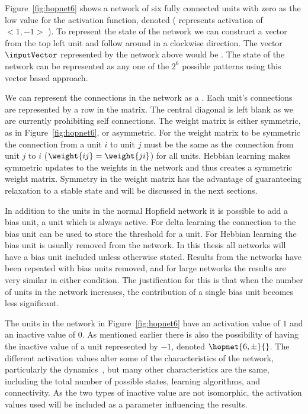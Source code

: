 Figure~\ref{fig:hopnet6} shows a network of six fully connected units with zero as the low value for the activation function, denoted  ( represents activation of $<1,-1>$ ).  To represent the state of the network we can construct a vector from the top left unit and follow around in a clockwise direction.  The vector  \(\inputVector \) represented by the network above would be .  The state of the network can be represented as any one of the \(2^6\) possible patterns using this vector based approach.    

We can represent the connections in the network as a  \weightMatrix{}. Each unit's connections are represented by a row in the matrix. The central diagonal is left blank as we are currently prohibiting self connections.  The weight matrix is either symmetric, as in Figure~\ref{fig:hopnet6}, or asymmetric. For the weight matrix to be symmetric the connection from a unit $i$ to unit $j$ must be the same as the connection from unit $j$ to $i$ ($\weight{ij} = \weight{ji}$) for all units. Hebbian learning makes symmetric updates to the weights in the network and thus creates a symmetric weight matrix.  Symmetry in the weight matrix has the advantage of guaranteeing relaxation to a stable state and will be discussed in the next sections.
 
In addition to the units in the normal Hopfield network it is possible to add a bias unit, a unit which is always active.  For delta learning the connection to the bias unit can be used to store the threshold for a unit.  For Hebbian learning the bias unit is usually removed from the network.  In this thesis all networks will have a bias unit included unless otherwise stated.  Results from the networks have been repeated with bias units removed, and for large networks the results are very similar in either condition.  The justification for this is that when the number of units in the network increases, the contribution of a single bias unit becomes less significant.

The units in the network in Figure~\ref{fig:hopnet6} have an activation value of $1$ and an inactive value of $0$.  As mentioned earlier there is also the possibility of having the inactive value of a unit represented by $-1$, denoted $\hopnet{6,\pm}{}$. The different activation values alter some of the characteristics of the network, particularly the dynamics~\citep{Horn1998,Davey2000}, but many other characteristics are the same, including the total number of possible states, learning algorithms, and connectivity.  As the two types of inactive value are not isomorphic, the activation values used will be included as a parameter influencing the results.

